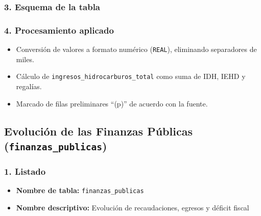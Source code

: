 \documentclass[12pt,a4paper]{article}
\begin{document}
\subsubsection*{3. Esquema de la tabla}

\subsubsection*{4. Procesamiento aplicado}
\begin{itemize}
  \item Conversión de valores a formato numérico (\texttt{REAL}), eliminando separadores de miles.
  \item Cálculo de \texttt{ingresos\_hidrocarburos\_total} como suma de IDH, IEHD y regalías.
  \item Marcado de filas preliminares “(p)” de acuerdo con la fuente.
\end{itemize}
\subsection{Evolución de las Finanzas Públicas\\
\small(\texttt{finanzas\_publicas})}

\subsubsection*{1. Listado}
\begin{itemize}
  \item \textbf{Nombre de tabla:} \texttt{finanzas\_publicas}
  \item \textbf{Nombre descriptivo:} Evolución de recaudaciones, egresos y déficit fiscal
\end{itemize}
\end{document}
